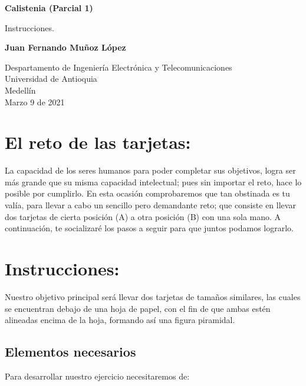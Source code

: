 \documentclass{article}
\begin{document}
\begin{titlepage}
    \begin{center}
        \vspace*{1cm}
            
        \Huge
        \textbf{Calistenia (Parcial 1)}
            
        \vspace{0.5cm}
        \LARGE
        Instrucciones.
            
        \vspace{1.5cm}
            
        \textbf{Juan Fernando Muñoz López}
            
        \vfill
            
        \vspace{0.8cm}
            
        \Large
        Despartamento de Ingeniería Electrónica y Telecomunicaciones\\
        Universidad de Antioquia\\
        Medellín\\
        Marzo 9 de 2021
            
    \end{center}
\end{titlepage}

\tableofcontents
\newpage
\section{El reto de las tarjetas: }\label{intro}
La capacidad de los seres humanos para poder completar sus objetivos, logra ser más grande que su misma capacidad intelectual; pues sin importar el reto, hace lo posible por cumplirlo. En esta ocasión comprobaremos que tan obstinada es tu valía, para llevar a cabo un sencillo pero demandante reto; que consiste en llevar dos tarjetas de cierta posición (A) a otra posición (B) con una sola mano. A continuación, te socializaré los pasos a seguir para que juntos podamos lograrlo.

\section{Instrucciones: } \label{contenido}
Nuestro objetivo principal será llevar dos tarjetas de tamaños similares, las cuales se encuentran debajo de una hoja de papel, con el fin de que ambas estén alineadas encima de la hoja, formando así una figura piramidal.
\subsection{Elementos necesarios}
Para desarrollar nuestro ejercicio necesitaremos de:
\newline 
\end{document}
